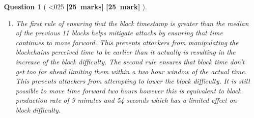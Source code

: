 \documentclass[a4paper]{article}
\theoremstyle{que}
\newtheorem{question}{Question}
\newcommand\points[1]{%
\ifnum1<0#1\relax%
    {\bf \small [#1~marks]}%
  \else%
    {\bf \small [#1~mark]}%
  \fi%
}%
\begin{document}
\begin{question}[\points{25}]
\begin{enumerate}[label=(\alph*)]
    \item[(iii)] The first rule of ensuring that the block timestamp is greater than the median of the previous 11 blocks helps mitigate attacks by ensuring that time continues to move forward. This prevents attackers from manipulating the blockchains perceived time to be earlier than it actually is resulting in the increase of the block difficulty. The second rule ensures that block time don't get too far ahead limiting them within a two hour window of the actual time. This prevents attackers from attempting to lower the block difficulty. It is still possible to move time forward two hours however this is equivalent to block production rate of 9 minutes and 54 seconds \cite{bitmex_block_timestamp} which has a limited effect on block difficulty.
  \end{enumerate}
\end{question}

\newpage

\end{document}
